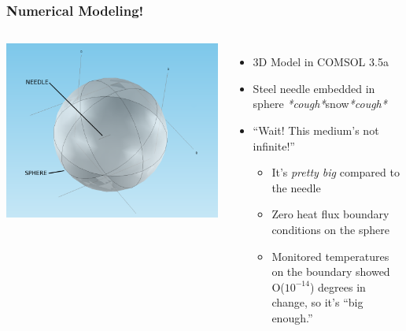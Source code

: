\documentclass{beamer}
\begin{document}
\begin{frame}
\frametitle{Numerical Modeling!}
\begin{columns}[c]
    \includegraphics[width=\textwidth]{fig/domain_2.png}
    \begin{itemize}
    \item 3D Model in COMSOL 3.5a
    \item Steel needle embedded in sphere \emph{*cough*}snow\emph{*cough*}
    \item ``Wait! This medium's not infinite!'' \begin{itemize}
        \item It's \emph{pretty big} compared to the needle
        \item Zero heat flux boundary conditions on the sphere
        \item Monitored temperatures on the boundary showed O(\(10^{-14}\)) degrees in change, so it's ``big enough.''
        \end{itemize}
    \end{itemize}
\end{columns}
\end{frame}
\end{document}
